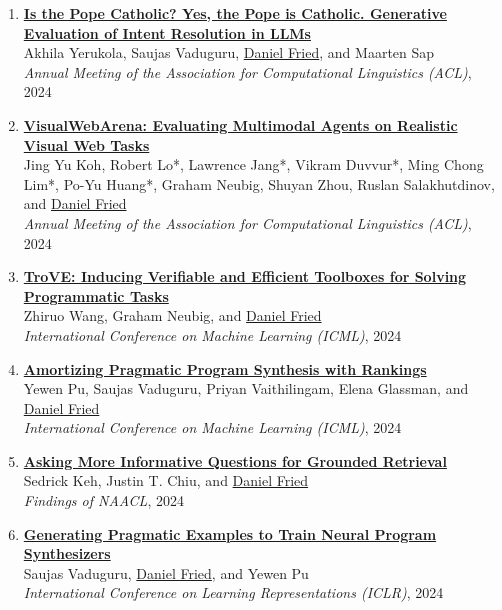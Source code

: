 \begin{enumerate}[leftmargin=-1mm,partopsep=0pt]
\item \href{https://arxiv.org/abs/2405.08760}{\textbf{Is the Pope Catholic? Yes, the Pope is Catholic. Generative Evaluation of Intent Resolution in LLMs}} \\
  Akhila Yerukola, Saujas Vaduguru, \underline{Daniel Fried}, and Maarten Sap\\
  \emph{Annual Meeting of the Association for Computational Linguistics (ACL)}, 2024

\item \href{https://arxiv.org/abs/2401.13649}{\textbf{VisualWebArena: Evaluating Multimodal Agents on Realistic Visual Web Tasks}} \\
  Jing Yu Koh, Robert Lo*, Lawrence Jang*, Vikram Duvvur*, Ming Chong Lim*, Po-Yu Huang*, Graham Neubig, Shuyan Zhou, Ruslan Salakhutdinov, and \underline{Daniel Fried}\\
  \emph{Annual Meeting of the Association for Computational Linguistics (ACL)}, 2024

\item \href{https://arxiv.org/abs/2401.12869}{\textbf{TroVE: Inducing Verifiable and Efficient Toolboxes for Solving Programmatic Tasks}} \\
  Zhiruo Wang, Graham Neubig, and \underline{Daniel Fried}\\
  \emph{International Conference on Machine Learning (ICML)}, 2024

\item \href{https://arxiv.org/abs/2407.02499}{\textbf{Amortizing Pragmatic Program Synthesis with Rankings}} \\
  Yewen Pu, Saujas Vaduguru, Priyan Vaithilingam, Elena Glassman, and \underline{Daniel Fried}\\
  \emph{International Conference on Machine Learning (ICML)}, 2024

\item \href{https://arxiv.org/abs/2311.08584}{\textbf{Asking More Informative Questions for Grounded Retrieval}} \\
  Sedrick Keh, Justin T. Chiu, and \underline{Daniel Fried}\\
  \emph{Findings of NAACL}, 2024

\item \href{https://arxiv.org/abs/2311.05740}{\textbf{Generating Pragmatic Examples to Train Neural Program Synthesizers}} \\
  Saujas Vaduguru, \underline{Daniel Fried}, and Yewen Pu\\
  \emph{International Conference on Learning Representations (ICLR)}, 2024


\end{enumerate}
